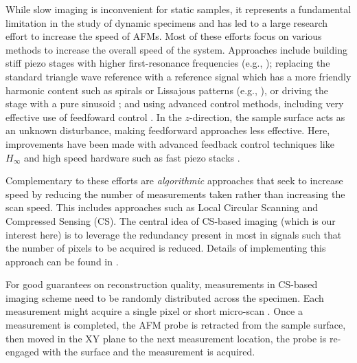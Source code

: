 \documentclass[journal,twocolumn,twoside]{IEEEtran}
\begin{document}
While slow imaging is inconvenient for static samples, it represents a fundamental limitation in the study of dynamic specimens and  has led to a large research effort to increase the speed of AFMs. Most of these efforts focus on various methods to increase the overall speed of the system. Approaches include building stiff piezo stages with higher first-resonance frequencies (e.g., \cite{schitter_designmodeling,kenton_threeaxis}); replacing the standard triangle wave reference with a reference signal which has a more friendly harmonic content such as spirals or Lissajous patterns (e.g., \cite{Mahmood_nano_2009,Tuma:2012hv,rana_spiral_2014}), or driving the stage with a pure sinusoid \cite{fleming_bridging_2010}; and using advanced control methods, including very effective use of feedfoward control \cite{butterworth_dualadaptive_2011, li_feedforward_2007,moheimani_IRC, Leang_IEEECS_2009}. In the $z$-direction, the sample surface acts as an unknown disturbance, making feedforward approaches less effective. Here, improvements have been made with advanced feedback control techniques like $H_{\infty}$ and high speed hardware such as fast piezo stacks \cite{fleming_bridging_2010, reza_zaxis_videorate}.


Complementary to these efforts are \emph{algorithmic} approaches that seek to increase speed by reducing the number of measurements taken rather than increasing the scan speed. This includes approaches such as Local Circular Scanning \cite{Huang:2014dw,Hartman:2017ud} and Compressed Sensing (CS). The central idea of CS-based imaging (which is our interest here) is to leverage the redundancy present in most in signals such that the  number of pixels to be acquired is reduced. Details of implementing this approach can be found in \cite{braker_hardware_2018}.

For good guarantees on reconstruction quality, measurements in CS-based imaging scheme need to be randomly distributed across the specimen. Each measurement might acquire a single pixel \cite{andersson_pao} or short micro-scan \cite{braker_hardware_2018, maxwell_acc_2014}. Once a measurement is completed, the AFM probe is retracted from the sample surface, then moved in the XY plane to the next measurement location, the probe is re-engaged with the surface and the measurement is acquired. 
\end{document}
